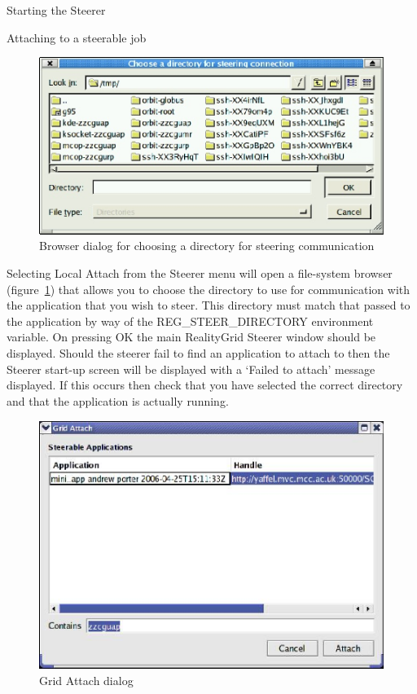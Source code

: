 \documentclass[a4paper,twoside]{article}
\begin{document}
\begin{section}{Starting the Steerer}
\begin{subsection}{Attaching to a steerable job}

\begin{figure}
\centerline{\includegraphics{dir_browser.eps}}
\caption{Browser dialog for choosing a directory for steering communication}
\label{fig:dir_browser}
\end{figure}

Selecting Local Attach from the Steerer menu will open a file-system
browser (figure~\ref{fig:dir_browser}) that allows you to choose the
directory to use for communication with the application that you wish
to steer.  This directory must match that passed to the application by
way of the REG\_\-STEER\_\-DIRECTORY environment variable.  On
pressing OK the main RealityGrid Steerer window should be displayed.
Should the steerer fail to find an application to attach to then the
Steerer start-up screen will be displayed with a `Failed to attach'
message displayed.  If this occurs then check that you have selected
the correct directory and that the application is actually running.

\begin{figure}
\centerline{\includegraphics{grid_attach.eps}}
\caption{Grid Attach dialog}
\label{fig:grid_attach}
\end{figure}


\end{subsection}
\end{section}
\end{document}
